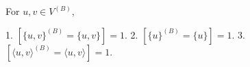 For $u, v \in V^{(B)}$,

1. $[\{u, v\}^{(B)} = \{u, v\}] = 1.$
2. $[\{u\}^{(B)} = \{u\}] = 1.$
3. $[\langle u, v \rangle^{(B)} = \langle u, v \rangle] = 1.$
